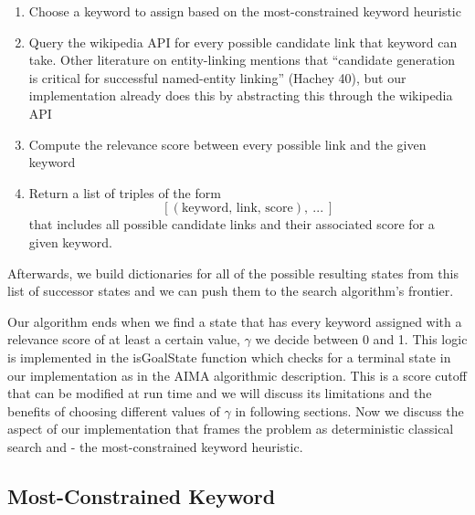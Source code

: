 \documentclass[twoside,11pt]{article}
\begin{document}
\begin{enumerate}
  \item Choose a keyword to assign based on the most-constrained keyword heuristic
  \item Query the wikipedia API for every possible candidate link that keyword can take. Other literature on entity-linking mentions that “candidate generation is critical for successful named-entity linking” (Hachey 40), but our implementation already does this by abstracting this through the wikipedia API
  \item Compute the relevance score between every possible link and the given keyword
  \item Return a list of triples of the form $$[(\mbox{keyword, link, score}), \ ... \ ]$$ that includes all possible candidate links and their associated score for a given keyword.
\end{enumerate}
Afterwards, we build dictionaries for all of the possible resulting states from this list of successor states and we can push them to the search algorithm’s frontier.

Our algorithm ends when we find a state that has every keyword assigned with a relevance score of at least a certain value, $\gamma$ we decide between 0 and 1. This logic is implemented in the {\sc isGoalState} function which checks for a terminal state in our implementation as in the AIMA algorithmic description. This is a score cutoff that can be modified at run time and we will discuss its limitations and the benefits of choosing different values of $\gamma$ in following sections. Now we discuss the aspect of our implementation that frames the problem as deterministic classical search and - the most-constrained keyword heuristic.

\subsection{Most-Constrained Keyword}
\end{document}
